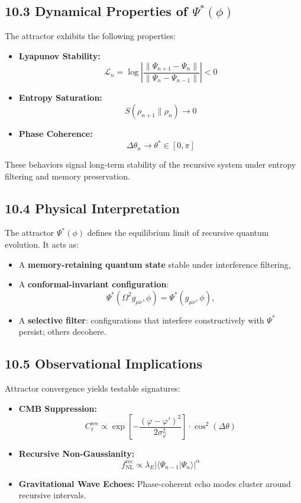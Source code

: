 \subsection{10.3 Dynamical Properties of \( \Psi^*(\phi) \)}

The attractor exhibits the following properties:

\begin{itemize}
    \item \textbf{Lyapunov Stability:}
    \[
    \mathcal{L}_n = \log \left| \frac{\|\Psi_{n+1} - \Psi_n\|}{\|\Psi_n - \Psi_{n-1}\|} \right| < 0
    \]
    \item \textbf{Entropy Saturation:}
    \[
    S(\rho_{n+1} \| \rho_n) \to 0
    \]
    \item \textbf{Phase Coherence:}
    \[
    \Delta \theta_n \to \theta^* \in [0, \pi]
    \]
\end{itemize}

These behaviors signal long-term stability of the recursive system under entropy filtering and memory preservation.

\subsection{10.4 Physical Interpretation}

The attractor \( \Psi^*(\phi) \) defines the equilibrium limit of recursive quantum evolution. It acts as:
\begin{itemize}
    \item A \textbf{memory-retaining quantum state} stable under interference filtering,
    \item A \textbf{conformal-invariant configuration}:
    \[
    \Psi^*(\Omega^2 g_{\mu\nu}, \phi) = \Psi^*(g_{\mu\nu}, \phi),
    \]
    \item A \textbf{selective filter}: configurations that interfere constructively with \( \Psi^* \) persist; others decohere.
\end{itemize}

\subsection{10.5 Observational Implications}

Attractor convergence yields testable signatures:

\begin{itemize}
    \item \textbf{CMB Suppression:}
    \[
    C_\ell^{\text{rec}} \propto \exp\left[-\frac{(\varphi - \varphi')^2}{2\sigma_\varphi^2}\right] \cdot \cos^2(\Delta \theta)
    \]
    \item \textbf{Recursive Non-Gaussianity:}
    \[
    f_{\text{NL}}^{\text{rec}} \propto \lambda_E |\langle \Psi_{n-1} | \Psi_n \rangle|^\alpha
    \]
    \item \textbf{Gravitational Wave Echoes:}
    Phase-coherent echo modes cluster around recursive intervals.
\end{itemize}

